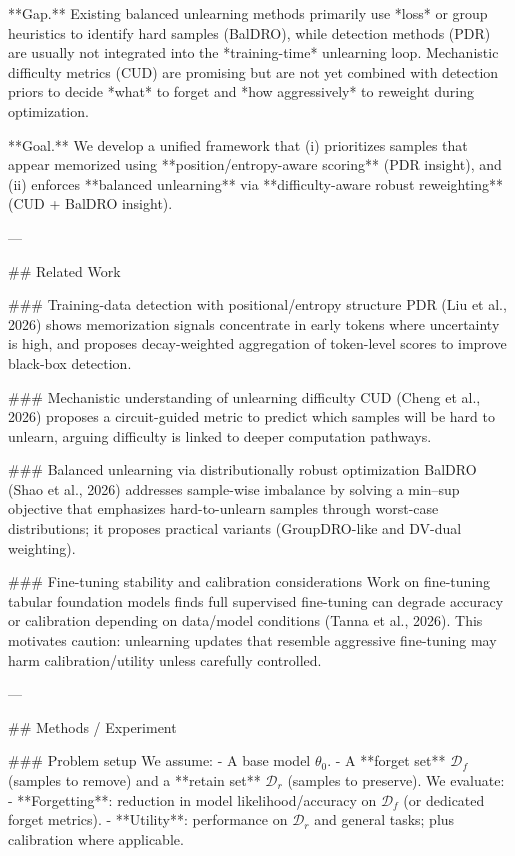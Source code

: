 **Gap.** Existing balanced unlearning methods primarily use *loss* or group heuristics to identify hard samples (BalDRO), while detection methods (PDR) are usually not integrated into the *training-time* unlearning loop. Mechanistic difficulty metrics (CUD) are promising but are not yet combined with detection priors to decide *what* to forget and *how aggressively* to reweight during optimization.

**Goal.** We develop a unified framework that (i) prioritizes samples that appear memorized using **position/entropy-aware scoring** (PDR insight), and (ii) enforces **balanced unlearning** via **difficulty-aware robust reweighting** (CUD + BalDRO insight).

---

## Related Work  

### Training-data detection with positional/entropy structure  
PDR (Liu et al., 2026) shows memorization signals concentrate in early tokens where uncertainty is high, and proposes decay-weighted aggregation of token-level scores to improve black-box detection.

### Mechanistic understanding of unlearning difficulty  
CUD (Cheng et al., 2026) proposes a circuit-guided metric to predict which samples will be hard to unlearn, arguing difficulty is linked to deeper computation pathways.

### Balanced unlearning via distributionally robust optimization  
BalDRO (Shao et al., 2026) addresses sample-wise imbalance by solving a min–sup objective that emphasizes hard-to-unlearn samples through worst-case distributions; it proposes practical variants (GroupDRO-like and DV-dual weighting).

### Fine-tuning stability and calibration considerations  
Work on fine-tuning tabular foundation models finds full supervised fine-tuning can degrade accuracy or calibration depending on data/model conditions (Tanna et al., 2026). This motivates caution: unlearning updates that resemble aggressive fine-tuning may harm calibration/utility unless carefully controlled.

---

## Methods / Experiment  

### Problem setup  
We assume:
- A base model \( \theta_0 \).  
- A **forget set** \( \mathcal{D}_f \) (samples to remove) and a **retain set** \( \mathcal{D}_r \) (samples to preserve).  
We evaluate:
- **Forgetting**: reduction in model likelihood/accuracy on \( \mathcal{D}_f \) (or dedicated forget metrics).  
- **Utility**: performance on \( \mathcal{D}_r \) and general tasks; plus calibration where applicable.

